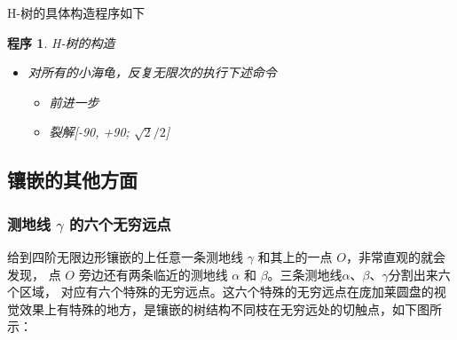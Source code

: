 \documentclass[a4paper,12pt]{article}
\newtheorem{program}{程序}
\begin{document}
H-树的具体构造程序如下

\begin{program}
H-树的构造
\begin{itemize}
\item 对所有的小海龟，反复无限次的执行下述命令
\begin{itemize}\item 前进一步 \item 裂解[-90, +90; $\sqrt{2} / 2$] \end{itemize}
\end{itemize}
\end{program}

\newpage

\subsection{镶嵌的其他方面}

\subsubsection{测地线 $\gamma$ 的六个无穷远点}

给到四阶无限边形镶嵌的上任意一条测地线 $\gamma$ 和其上的一点 $O$，非常直观的就会发现，
点 $O$ 旁边还有两条临近的测地线 $\alpha$ 和 $\beta$。三条测地线$\alpha$、$\beta$、$\gamma$分割出来六个区域，
对应有六个特殊的无穷远点。这六个特殊的无穷远点在庞加莱圆盘的视觉效果上有特殊的地方，是镶嵌的树结构不同枝在无穷远处的切触点，如下图所示：
\end{document}
